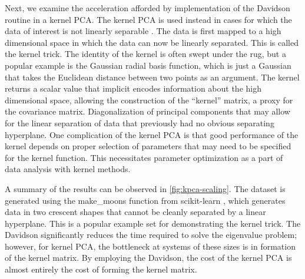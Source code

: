 \documentclass[12pt, fleqn]{article}
\begin{document}
Next, we examine the acceleration afforded by implementation of the Davidson routine in a kernel PCA.
The kernel PCA is used instead in cases for which the data of interest is not linearly separable \cite{Scholkopf1998}.
The data is first mapped to a high dimensional space in which the data can now be linearly separated.
This is called the kernel trick.
The identity of the kernel is often swept under the rug, but a popular example is the Gaussian radial basis function, which is just a Gaussian that takes the Euclidean distance between two points as an argument. 
The kernel returns a scalar value that implicit encodes information about the high dimensional space, allowing the construction of the ``kernel'' matrix, a proxy for the covariance matrix.
Diagonalization of principal components that may allow for the linear separation of data that previously had no obvious separating hyperplane. 
One complication of the kernel PCA is that good performance of the kernel depends on proper selection of parameters that may need to be specified for the kernel function.
This necessitates parameter optimization as a part of data analysis with kernel methods.

A summary of the results can be observed in \autoref{fig:kpca-scaling}. 
The dataset is generated using the \textsf{make\_moons} function from scikit-learn \cite{scikit}, which generates data in two crescent shapes that cannot be cleanly separated by a linear hyperplane. 
This is a popular example set for demonstrating the kernel trick. 
The Davidson significantly reduces the time required to solve the eigenvalue problem; however, for kernel PCA, the bottleneck at systems of these sizes is in formation of the kernel matrix. 
By employing the Davidson, the cost of the kernel PCA is almost entirely the cost of forming the kernel matrix. 
\end{document}
